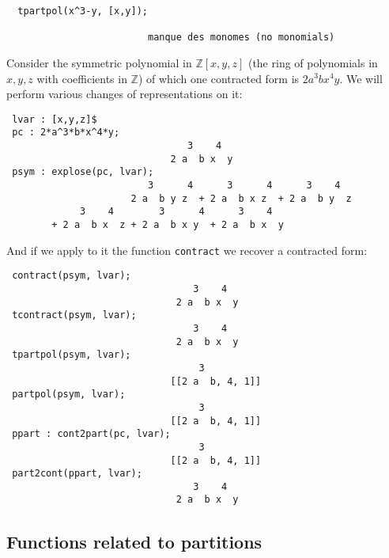 \documentclass[11pt]{article}
\begin{document}
\begin{verbatim}
  tpartpol(x^3-y, [x,y]);

                         manque des monomes (no monomials)
\end{verbatim}
Consider the symmetric polynomial in $\mathbb{Z}[x,y,z]$ (the ring of
polynomials in $x,y,z$ with coefficients in $\mathbb{Z}$) of which one
contracted form is $2a^3bx^4y$. We will perform various changes of
representations on it:
\small
\begin{verbatim}
 lvar : [x,y,z]$
 pc : 2*a^3*b*x^4*y;  
                                3    4
                             2 a  b x  y
 psym : explose(pc, lvar);
                         3      4      3      4      3    4   
                      2 a  b y z  + 2 a  b x z  + 2 a  b y  z 
             3    4        3      4      3    4
        + 2 a  b x  z + 2 a  b x y  + 2 a  b x  y
\end{verbatim}
\normalsize And if we apply to it the function \texttt{contract} we recover a
contracted form:
\small
\begin{verbatim}
 contract(psym, lvar);
                                 3    4
                              2 a  b x  y
 tcontract(psym, lvar);
                                 3    4
                              2 a  b x  y
 tpartpol(psym, lvar);
                                  3
                             [[2 a  b, 4, 1]]
 partpol(psym, lvar);
                                  3
                             [[2 a  b, 4, 1]]
 ppart : cont2part(pc, lvar);
                                  3
                             [[2 a  b, 4, 1]]
 part2cont(ppart, lvar);
                                 3    4
                              2 a  b x  y
\end{verbatim}
\normalsize



\subsection{Functions related to partitions}
\end{document}

